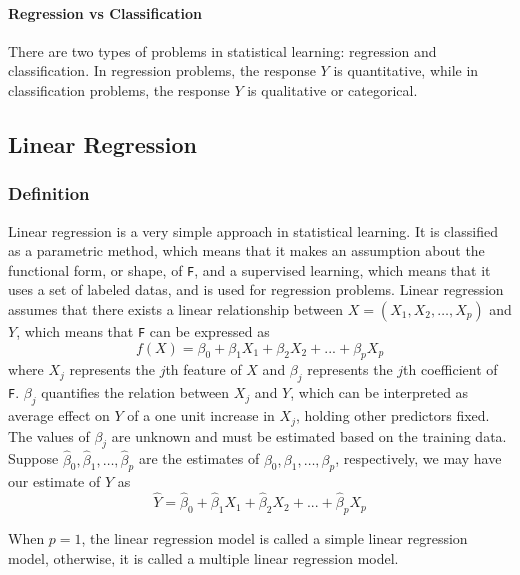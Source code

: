 \documentclass[conf]{new-aiaa}
\begin{document}
\paragraph{Regression vs Classification}
There are two types of problems in statistical learning: regression and classification. In regression problems, the response $Y$ is quantitative, while in classification problems, the response $Y$ is qualitative or categorical.

\subsection{Linear Regression}
\subsubsection{Definition}
Linear regression is a very simple approach in statistical learning. It is classified as a parametric method, which means that it makes an assumption about the functional form, or shape, of \texttt{F}, and a supervised learning, which means that it uses a set of labeled datas, and is used for regression problems. Linear regression assumes that there exists a linear relationship between $X = (X_1, X_2, \dots, X_p)$ and $Y$, which means that \texttt{F} can be expressed as
\begin{equation} \label{eq:linmod}
    f(X) = \beta_0 + \beta_1X_1 + \beta_2X_2 + ... + \beta_pX_p
\end{equation}
where $X_j$ represents the $j$th feature of $X$ and $\beta_j$ represents the $j$th coefficient of \texttt{F}. $\beta_j$ quantifies the relation between $X_j$ and $Y$, which can be interpreted as average effect on $Y$ of a one unit increase in $X_j$, holding other predictors fixed. The values of $\beta_j$ are unknown and must be estimated based on the training data. Suppose $\hat{\beta}_0, \hat{\beta}_1, \dots, \hat{\beta}_p$ are the estimates of $\beta_0, \beta_1, \dots, \beta_p$, respectively, we may have our estimate of $Y$ as
\begin{equation} \label{eq:linreg}
    \hat{Y} = \hat{\beta}_0 + \hat{\beta}_1X_1 + \hat{\beta}_2X_2 + ... + \hat{\beta}_pX_p
\end{equation}

When $p = 1$, the linear regression model is called a simple linear regression model, otherwise, it is called a multiple linear regression model.
\end{document}
